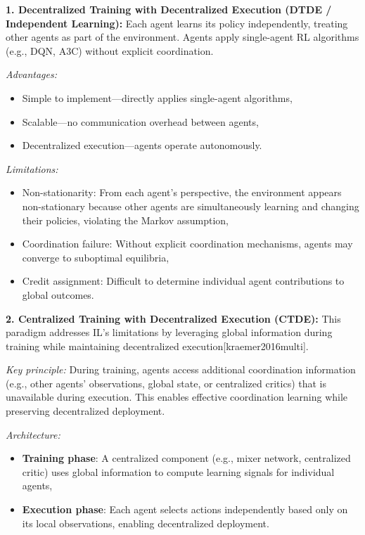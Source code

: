 \textbf{1. Decentralized Training with Decentralized Execution (DTDE / Independent Learning):} Each agent learns its policy independently, treating other agents as part of the environment. Agents apply single-agent RL algorithms (e.g., DQN, A3C) without explicit coordination.

\textit{Advantages:}
\begin{itemize}
    \item Simple to implement—directly applies single-agent algorithms,
    \item Scalable—no communication overhead between agents,
    \item Decentralized execution—agents operate autonomously.
\end{itemize}

\textit{Limitations:}
\begin{itemize}
    \item Non-stationarity: From each agent's perspective, the environment appears non-stationary because other agents are simultaneously learning and changing their policies, violating the Markov assumption,
    \item Coordination failure: Without explicit coordination mechanisms, agents may converge to suboptimal equilibria,
    \item Credit assignment: Difficult to determine individual agent contributions to global outcomes.
\end{itemize}

\textbf{2. Centralized Training with Decentralized Execution (CTDE):} This paradigm addresses IL's limitations by leveraging global information during training while maintaining decentralized execution[kraemer2016multi].

\textit{Key principle:} During training, agents access additional coordination information (e.g., other agents' observations, global state, or centralized critics) that is unavailable during execution. This enables effective coordination learning while preserving decentralized deployment.

\textit{Architecture:}
\begin{itemize}
    \item \textbf{Training phase}: A centralized component (e.g., mixer network, centralized critic) uses global information to compute learning signals for individual agents,
    \item \textbf{Execution phase}: Each agent selects actions independently based only on its local observations, enabling decentralized deployment.
\end{itemize}


